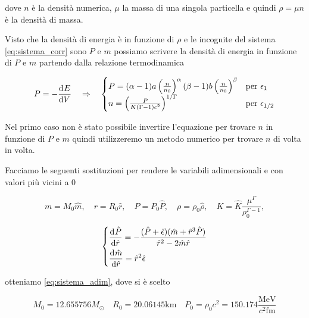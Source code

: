 \documentclass[a4paper, titlepage]{article}
\begin{document}
dove $n$ è la densità numerica, $\mu$ la massa di una singola particella e quindi $\rho = \mu n$ è la densità di massa.


Visto che la densità di energia è in funzione di $\rho$ e le incognite del sistema \ref{eq:sistema_corr} sono $P$ e $m$ possiamo scrivere la densità di energia in funzione di $P$ e $m$ partendo dalla relazione termodinamica

\begin{equation}
    P = - \dv[]{E}{V} \quad \Rightarrow \quad
    \begin{cases}
        P = (\alpha - 1) a \left( \frac{n}{n_0} \right)^{\alpha} (\beta - 1) b \left( \frac{n}{n_0} \right)^{\beta} & \text{per } \epsilon_1 \\
        n = \left( \frac{P}{K(\Gamma - 1) c^2} \right) ^ {1 / \Gamma} & \text{per } \epsilon_{1/2}
    \end{cases}
\end{equation}

Nel primo caso non è stato possibile invertire l'equazione per trovare $n$ in funzione di $P$ e $m$ quindi utilizzeremo un metodo numerico per trovare $n$ di volta in volta.


Facciamo le seguenti sostituzioni per rendere le variabili adimensionali e con valori più vicini a 0

\begin{equation*}
    m=M_0\hat{m}, \quad 
    r=R_0\hat{r}, \quad 
    P=P_0\hat{P}, \quad
    \rho=\rho_0 \hat{\rho}, \quad
    K = \hat{K}\frac{\mu^\Gamma}{\rho_0^{\Gamma-1}},
\end{equation*}

\begin{equation}
    \begin{dcases}
        \dv[]{\hat{P}}{\hat{r}}=-\frac{(\hat{P}+\hat{\epsilon})(\hat{m}+\hat{r}^3\hat{P})}{\hat{r}^2-2\hat{m}\hat{r}}\\
        \dv[]{\hat{m}}{\hat{r}}= \hat{r}^2 \hat{\epsilon}
    \end{dcases}
    \label{eq:sistema_adim}
\end{equation}

otteniamo \ref{eq:sistema_adim}, dove si è scelto

\begin{equation}
    M_0 = 12.655756 M_\odot \quad R_0 = 20.06145 \unit{\kilo\meter} \quad P_0 = \rho_0 c^2 = 150.174 \frac{\unit{\mega\electronvolt}}{c^2 \unit{\femto\meter}}
\end{equation}
\end{document}
